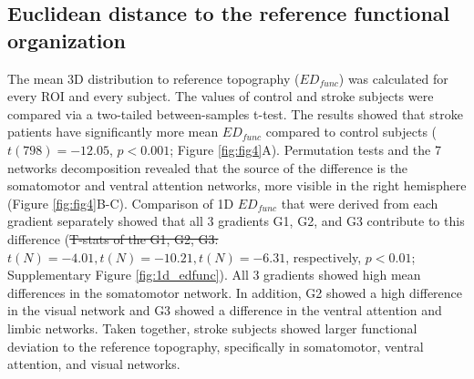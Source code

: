 \documentclass[fleqn,10pt]{wlscirep}
\begin{document}
\subsection*{Euclidean distance to \color{blue}the reference \color{black}functional organization}
The mean 3D distribution to reference topography ($\textit{ED}_{func}$) was calculated for every ROI and every subject. The values of control and stroke subjects were compared via a two-tailed between-samples t-test. The results showed that stroke patients have significantly more mean $\textit{ED}_{{func}}$ compared to control subjects ($t(798) =  -12.05$, $p < 0.001$; Figure  \ref{fig:fig4}A). Permutation tests and the 7 networks decomposition revealed that the source of the difference is the somatomotor and ventral attention networks, more visible in the right hemisphere (Figure  \ref{fig:fig4}B-C). Comparison of 1D $\textit{ED}_{{func}}$ that were derived from each gradient separately showed that all 3 gradients \color{blue}G1, G2, and G3 \color{black} contribute to this difference (\color{red}\st{T-stats of the G1, G2, G3:} \color{purple} $t(N)=-4.01, t(N)=-10.21, t(N)=-6.31$, \color{black}respectively, $p<0.01$; Supplementary Figure \ref{fig:1d_edfunc}). All 3 gradients showed high mean differences in the somatomotor network. In addition, G2 showed a high difference in the visual network and G3 showed a difference in the ventral attention and limbic networks. Taken together, stroke subjects showed larger functional deviation to the reference topography, specifically in somatomotor, ventral attention, and visual networks. 
\end{document}
